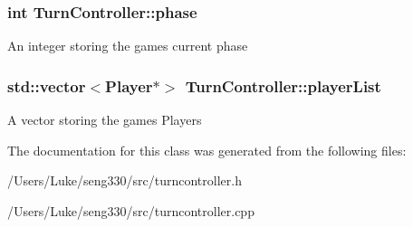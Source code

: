\subsubsection[{phase}]{\setlength{\rightskip}{0pt plus 5cm}int Turn\+Controller\+::phase}\label{class_turn_controller_a0e38c2319d233f54fe0a5daaa5fef964}
An integer storing the game\textquotesingle{}s current phase \hypertarget{class_turn_controller_a4f25fffc1441f66610f2ba821ac77d36}{}
\subsubsection[{player\+List}]{\setlength{\rightskip}{0pt plus 5cm}std\+::vector$<${\bf Player}$\ast$$>$ Turn\+Controller\+::player\+List}\label{class_turn_controller_a4f25fffc1441f66610f2ba821ac77d36}
A vector storing the game\textquotesingle{}s Players 

The documentation for this class was generated from the following files\+:\begin{DoxyCompactItemize}
\item 
/\+Users/\+Luke/seng330/src/turncontroller.\+h\item 
/\+Users/\+Luke/seng330/src/turncontroller.\+cpp\end{DoxyCompactItemize}
